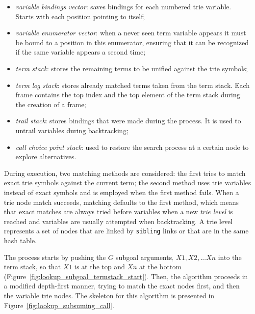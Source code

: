 \begin{itemize}
  \item \textit{variable bindings vector}: saves bindings for each numbered trie variable. Starts with each position pointing to itself;
  \item \textit{variable enumerator vector}: when a never seen term variable appears it must be bound to a position in this enumerator, ensuring that it can be recognized if the same variable appears a second time;
  \item \textit{term stack}: stores the remaining terms to be unified against the trie symbols;
  \item \textit{term log stack}: stores already matched terms taken from the term stack. Each frame contains the top index and the top element of the term stack during the creation of a frame;
  \item \textit{trail stack}: stores bindings that were made during the process. It is used to untrail variables during backtracking;
  \item \textit{call choice point stack}: used to restore the search process at a certain node to explore alternatives.
\end{itemize}

During execution, two matching methods are considered: the first tries to match exact trie symbols against the current term;
the second method uses trie variables instead of exact symbols and is employed when the first method fails.
When a trie node match succeeds, matching defaults to the first method, which means
that exact matches are always tried before variables when a new \textit{trie level} is reached and variables are usually attempted
when backtracking. A trie level represents a set of nodes that are linked by \texttt{sibling} links or that are
in the same hash table.

The process starts by pushing the $G$ subgoal arguments, $X1, X2, ...Xn$ into the term stack, so that $X1$ is at the top
and $Xn$ at the bottom (Figure~\ref{fig:lookup_subgoal_termstack_start}).
Then, the algorithm proceeds in a modified depth-first manner, trying to match the exact nodes first, and then
the variable trie nodes. The skeleton for this algorithm is presented in Figure~\ref{fig:lookup_subsuming_call}.

